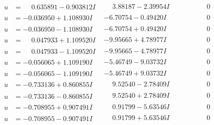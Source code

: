 \documentclass[1p]{elsarticle_modified}
\theoremstyle{definition}
\begin{document}
$$\begin{array}{c|c|c}
\begin{aligned}
u &= \phantom{-}0.635891 - 0.903812 I\end{aligned}
 & \phantom{-}3.88187 - 2.39954 I & \phantom{-0.000000 } 0 \\ \hline\begin{aligned}
u &= -0.036950 + 1.108930 I\end{aligned}
 & -6.70754 - 0.49420 I & \phantom{-0.000000 } 0 \\ \hline\begin{aligned}
u &= -0.036950 - 1.108930 I\end{aligned}
 & -6.70754 + 0.49420 I & \phantom{-0.000000 } 0 \\ \hline\begin{aligned}
u &= \phantom{-}0.047933 + 1.109520 I\end{aligned}
 & -9.95665 + 4.78977 I & \phantom{-0.000000 } 0 \\ \hline\begin{aligned}
u &= \phantom{-}0.047933 - 1.109520 I\end{aligned}
 & -9.95665 - 4.78977 I & \phantom{-0.000000 } 0 \\ \hline\begin{aligned}
u &= -0.056065 + 1.109190 I\end{aligned}
 & -5.46749 - 9.03732 I & \phantom{-0.000000 } 0 \\ \hline\begin{aligned}
u &= -0.056065 - 1.109190 I\end{aligned}
 & -5.46749 + 9.03732 I & \phantom{-0.000000 } 0 \\ \hline\begin{aligned}
u &= -0.733136 + 0.860855 I\end{aligned}
 & \phantom{-}9.52540 - 2.78409 I & \phantom{-0.000000 } 0 \\ \hline\begin{aligned}
u &= -0.733136 - 0.860855 I\end{aligned}
 & \phantom{-}9.52540 + 2.78409 I & \phantom{-0.000000 } 0 \\ \hline\begin{aligned}
u &= -0.708955 + 0.907491 I\end{aligned}
 & \phantom{-}0.91799 - 5.63546 I & \phantom{-0.000000 } 0 \\ \hline\begin{aligned}
u &= -0.708955 - 0.907491 I\end{aligned}
 & \phantom{-}0.91799 + 5.63546 I & \phantom{-0.000000 } 0 \\ \hline\begin{aligned}

\end{aligned}
\end{array}$$
\end{document}

